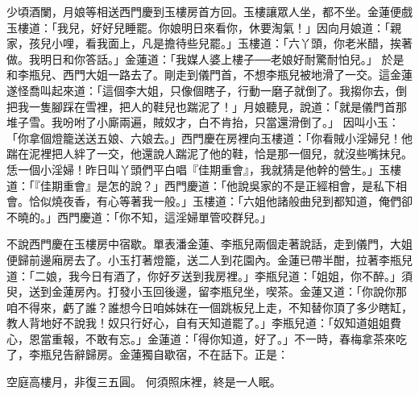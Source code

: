 少頃酒闌，月娘等相送西門慶到玉樓房首方回。玉樓讓眾人坐，都不坐。金蓮便戲玉樓道：「我兒，好好兒睡罷。你娘明日來看你，休要淘氣！」因向月娘道：「親家，孩兒小哩，看我面上，凡是擔待些兒罷。」玉樓道：「六丫頭，你老米醋，挨著做。我明日和你答話。」金蓮道：「我媒人婆上樓子──老娘好耐驚耐怕兒。」 於是和李瓶兒、西門大姐一路去了。剛走到儀門首，不想李瓶兒被地滑了一交。這金蓮遂怪喬叫起來道：「這個李大姐，只像個瞎子，行動一磨子就倒了。我搊你去，倒把我一隻腳踩在雪裡，把人的鞋兒也踹泥了！」月娘聽見，說道：「就是儀門首那堆子雪。我吩咐了小廝兩遍，賊奴才，白不肯抬，只當還滑倒了。」 因叫小玉：「你拿個燈籠送送五娘、六娘去。」西門慶在房裡向玉樓道：「你看賊小淫婦兒！他踹在泥裡把人絆了一交，他還說人踹泥了他的鞋，恰是那一個兒，就沒些嘴抹兒。恁一個小淫婦！昨日叫丫頭們平白唱『佳期重會』，我就猜是他幹的營生。」玉樓道：「『佳期重會』是怎的說？」西門慶道：「他說吳家的不是正經相會，是私下相會。恰似燒夜香，有心等著我一般。」玉樓道：「六姐他諸般曲兒到都知道，俺們卻不曉的。」西門慶道：「你不知，這淫婦單管咬群兒。」

不說西門慶在玉樓房中宿歇。單表潘金蓮、李瓶兒兩個走著說話，走到儀門，大姐便歸前邊廂房去了。小玉打著燈籠，送二人到花園內。金蓮已帶半酣，拉著李瓶兒道：「二娘，我今日有酒了，你好歹送到我房裡。」李瓶兒道：「姐姐，你不醉。」須臾，送到金蓮房內。打發小玉回後邊，留李瓶兒坐，喫茶。金蓮又道：「你說你那咱不得來，虧了誰？誰想今日咱姊妹在一個跳板兒上走，不知替你頂了多少瞎缸，教人背地好不說我！奴只行好心，自有天知道罷了。」李瓶兒道：「奴知道姐姐費心，恩當重報，不敢有忘。」金蓮道：「得你知道，好了。」不一時，春梅拿茶來吃了，李瓶兒告辭歸房。金蓮獨自歇宿，不在話下。正是：

空庭高樓月，非復三五圓。
何須照床裡，終是一人眠。
